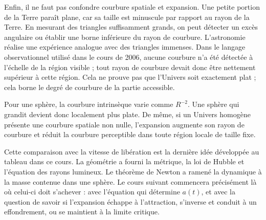 Enfin, il ne faut pas confondre courbure spatiale et expansion. Une petite portion de la Terre paraît plane, car sa taille est minuscule par rapport au rayon de la Terre. En mesurant des triangles suffisamment grands, on peut détecter un excès angulaire ou établir une borne inférieure du rayon de courbure. L’astronomie réalise une expérience analogue avec des triangles immenses. Dans le langage observationnel utilisé dans le cours de 2006, aucune courbure n’a été détectée à l’échelle de la région visible ; tout rayon de courbure devait donc être nettement supérieur à cette région. Cela ne prouve pas que l’Univers soit exactement plat ; cela borne le degré de courbure de la partie accessible.

Pour une sphère, la courbure intrinsèque varie comme \(R^{-2}\). Une sphère qui grandit devient donc localement plus plate. De même, si un Univers homogène présente une courbure spatiale non nulle, l’expansion augmente son rayon de courbure et réduit la courbure perceptible dans toute région locale de taille fixe.

\begin{classroomqa}
\end{classroomqa}

Cette comparaison avec la vitesse de libération est la dernière idée développée au tableau dans ce cours. La géométrie a fourni la métrique, la loi de Hubble et l’équation des rayons lumineux. Le théorème de Newton a ramené la dynamique à la masse contenue dans une sphère. Le cours suivant commencera précisément là où celui-ci doit s’achever : avec l’équation qui détermine \(a(t)\), et avec la question de savoir si l’expansion échappe à l’attraction, s’inverse et conduit à un effondrement, ou se maintient à la limite critique.
